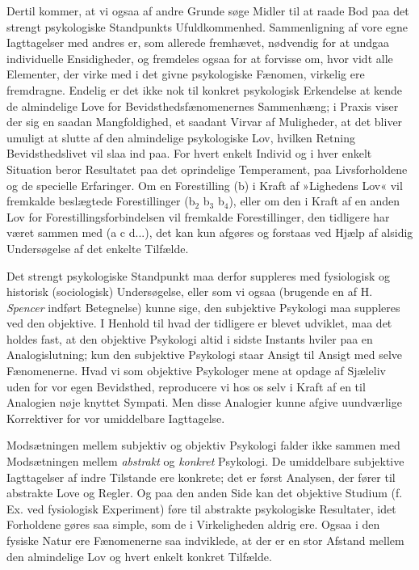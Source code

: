 \documentclass[12pt,a4paper,openany]{book}
\newcommand{\opage}[1]{\marginnote{\footnotesize\textit{[#1]}}}
\begin{document}
Dertil kommer, at vi ogsaa af andre Grunde søge Midler til at raade Bod
paa det strengt psykologiske Standpunkts Ufuldkommenhed. Sammenligning
af vore egne Iagttagelser med andres er, som allerede fremhævet,
nødvendig for at undgaa individuelle Ensidigheder, og fremdeles ogsaa
for at
\opage{29}forvisse om, hvor vidt alle Elementer, der virke med i det
givne psykologiske Fænomen, virkelig ere fremdragne. Endelig er det ikke
nok til konkret psykologisk Erkendelse at kende de almindelige Love for
Bevidsthedsfænomenernes Sammenhæng; i Praxis viser der sig en saadan
Mangfoldighed, et saadant Virvar af Muligheder, at det bliver umuligt at
slutte af den almindelige psykologiske Lov, hvilken Retning
Bevidsthedslivet vil slaa ind paa. For hvert enkelt Individ og i hver
enkelt Situation beror Resultatet paa det oprindelige Temperament, paa
Livsforholdene og de specielle Erfaringer. Om en Forestilling (b) i
Kraft af »Lighedens Lov« vil fremkalde beslægtede Forestillinger
(b$_{2}$ b$_{3}$ b$_{4}$), eller om den i Kraft af en anden Lov for
Forestillingsforbindelsen vil fremkalde Forestillinger, den tidligere
har været sammen med (a c d...), det kan kun afgøres og forstaas ved
Hjælp af alsidig Undersøgelse af det enkelte Tilfælde.

Det strengt psykologiske Standpunkt maa derfor suppleres med fysiologisk
og historisk (sociologisk) Undersøgelse, eller som vi ogsaa (brugende en
af H. \emph{Spencer} indført Betegnelse) kunne sige, den subjektive
Psykologi maa suppleres ved den objektive. I Henhold til hvad der
tidligere er blevet udviklet, maa det holdes fast, at den objektive
Psykologi altid i sidste Instants hviler paa en Analogislutning; kun den
subjektive Psykologi staar Ansigt til Ansigt med selve Fænomenerne. Hvad
vi som objektive Psykologer mene at opdage af Sjæleliv uden for vor egen
Bevidsthed, reproducere vi hos os selv i Kraft af en til Analogien nøje
knyttet Sympati. Men disse Analogier kunne afgive uundværlige
Korrektiver for vor umiddelbare Iagttagelse.

Modsætningen mellem subjektiv og objektiv Psykologi falder ikke sammen
med Modsætningen mellem \emph{abstrakt} og \emph{konkret} Psykologi. De
umiddelbare subjektive Iagttagelser af indre Tilstande ere konkrete; det
er først Analysen, der fører til abstrakte Love og Regler. Og paa den
anden Side kan det objektive Studium (f. Ex. ved fysiologisk Experiment)
føre til abstrakte psykologiske Resultater, idet Forholdene gøres saa
simple, som de i Virkeligheden aldrig ere. Ogsaa i den fysiske Natur ere
Fænomenerne saa indviklede, at der er en
\opage{30}stor Afstand mellem den almindelige Lov og hvert enkelt
konkret Tilfælde.
\end{document}
